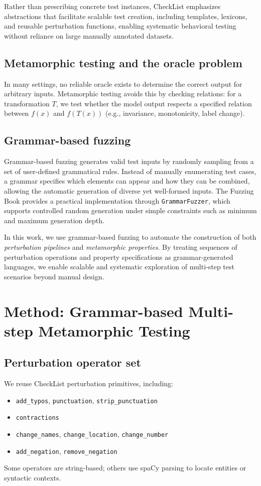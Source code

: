 \documentclass[11pt]{article}
\begin{document}
Rather than prescribing concrete test instances, CheckList emphasizes abstractions that facilitate scalable
test creation, including templates, lexicons, and reusable perturbation functions, enabling systematic
behavioral testing without reliance on large manually annotated datasets.



\subsection{Metamorphic testing and the oracle problem}
In many settings, no reliable oracle exists to determine the correct output for arbitrary inputs. Metamorphic testing avoids this by checking relations: for a transformation $T$, we test whether the model output respects a specified relation between $f(x)$ and $f(T(x))$ (e.g., invariance, monotonicity, label change).

\subsection{Grammar-based fuzzing}

Grammar-based fuzzing generates valid test inputs by randomly sampling from a set of user-defined grammatical rules.
Instead of manually enumerating test cases, a grammar specifies which elements can appear and how they can be combined,
allowing the automatic generation of diverse yet well-formed inputs.
The Fuzzing Book provides a practical implementation through \texttt{GrammarFuzzer},
which supports controlled random generation under simple constraints such as minimum and maximum generation depth.

In this work, we use grammar-based fuzzing to automate the construction of both
\emph{perturbation pipelines} and \emph{metamorphic properties}.
By treating sequences of perturbation operations and property specifications as grammar-generated languages,
we enable scalable and systematic exploration of multi-step test scenarios beyond manual design.

\section{Method: Grammar-based Multi-step Metamorphic Testing}

\subsection{Perturbation operator set}
We reuse CheckList perturbation primitives, including:
\begin{itemize}
  \item \texttt{add\_typos}, \texttt{punctuation}, \texttt{strip\_punctuation}
  \item \texttt{contractions}
  \item \texttt{change\_names}, \texttt{change\_location}, \texttt{change\_number}
  \item \texttt{add\_negation}, \texttt{remove\_negation}
\end{itemize}
Some operators are string-based; others use spaCy parsing to locate entities or syntactic contexts.
\end{document}
